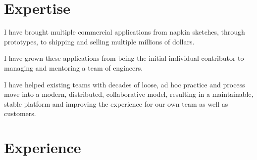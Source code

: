 \documentclass[letterpaper,10pt]{article}
\begin{document}


  
  \section{Expertise}

  \begin{resume_list}
    \item I have brought multiple commercial applications from napkin sketches, through prototypes, to shipping and selling multiple millions of dollars.
    \vspace{3pt}
    \item I have grown these applications from being the initial individual contributor to managing and mentoring a team of engineers.
    \vspace{3pt}
    \item I have helped existing teams with decades of loose, ad hoc practice and process move into a modern, distributed, collaborative model, resulting in a maintainable, stable platform and improving the experience for our own team as well as customers.
  \end{resume_list}


  \section{Experience}
\end{document}

